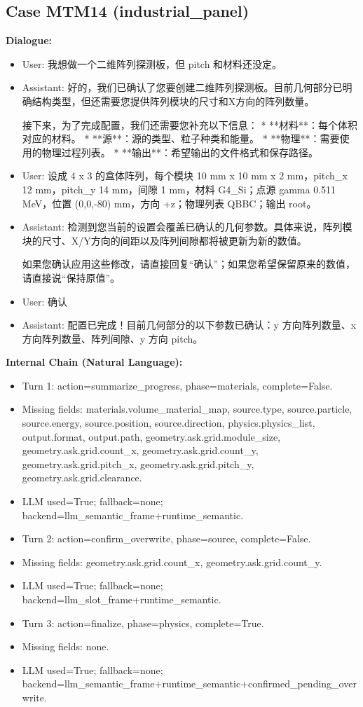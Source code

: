 \documentclass[11pt]{ctexart}
\begin{document}
\subsection{Case MTM14 (industrial\_panel)}
\textbf{Dialogue:}
\begin{itemize}
\item User: 我想做一个二维阵列探测板，但 pitch 和材料还没定。
\item Assistant: 好的，我们已确认了您要创建二维阵列探测板。目前几何部分已明确结构类型，但还需要您提供阵列模块的尺寸和X方向的阵列数量。

接下来，为了完成配置，我们还需要您补充以下信息：
*   **材料**：每个体积对应的材料。
*   **源**：源的类型、粒子种类和能量。
*   **物理**：需要使用的物理过程列表。
*   **输出**：希望输出的文件格式和保存路径。
\item User: 设成 4 x 3 的盒体阵列，每个模块 10 mm x 10 mm x 2 mm，pitch\_x 12 mm，pitch\_y 14 mm，间隙 1 mm，材料 G4\_Si；点源 gamma 0.511 MeV，位置 (0,0,-80) mm，方向 +z；物理列表 QBBC；输出 root。
\item Assistant: 检测到您当前的设置会覆盖已确认的几何参数。具体来说，阵列模块的尺寸、X/Y方向的间距以及阵列间隙都将被更新为新的数值。

如果您确认应用这些修改，请直接回复“确认”；如果您希望保留原来的数值，请直接说“保持原值”。
\item User: 确认
\item Assistant: 配置已完成！目前几何部分的以下参数已确认：y 方向阵列数量、x 方向阵列数量、阵列间隙、y 方向 pitch。
\end{itemize}
\textbf{Internal Chain (Natural Language):}
\begin{itemize}
\item Turn 1: action=summarize\_progress, phase=materials, complete=False.
\item Missing fields: materials.volume\_material\_map, source.type, source.particle, source.energy, source.position, source.direction, physics.physics\_list, output.format, output.path, geometry.ask.grid.module\_size, geometry.ask.grid.count\_x, geometry.ask.grid.count\_y, geometry.ask.grid.pitch\_x, geometry.ask.grid.pitch\_y, geometry.ask.grid.clearance.
\item LLM used=True; fallback=none; backend=llm\_semantic\_frame+runtime\_semantic.
\item Turn 2: action=confirm\_overwrite, phase=source, complete=False.
\item Missing fields: geometry.ask.grid.count\_x, geometry.ask.grid.count\_y.
\item LLM used=True; fallback=none; backend=llm\_slot\_frame+runtime\_semantic.
\item Turn 3: action=finalize, phase=physics, complete=True.
\item Missing fields: none.
\item LLM used=True; fallback=none; backend=llm\_semantic\_frame+runtime\_semantic+confirmed\_pending\_overwrite.
\end{itemize}
\end{document}
